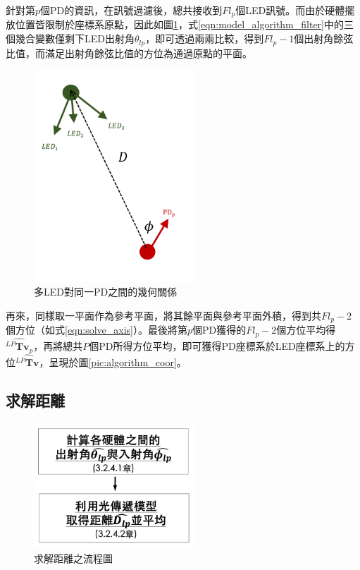     針對第$p$個PD的資訊，在訊號過濾後，總共接收到$Fl_p$個LED訊號。而由於硬體擺放位置皆限制於座標系原點，因此如圖\ref{pic:mulled_1pd}，式\ref{eqn:model_algorithm_filter}中的三個幾合變數僅剩下LED出射角$\theta_{lp}$，即可透過兩兩比較，得到$Fl_p-1$個出射角餘弦比值，而滿足出射角餘弦比值的方位為通過原點的平面。
    
    \begin{figure}[htpb]
        \centering
        \includegraphics[width=6cm]{ch3pic/mulled_1pd.png}
        \caption{多LED對同一PD之間的幾何關係}
        \label{pic:mulled_1pd}
    \end{figure}

    再來，同樣取一平面作為參考平面，將其餘平面與參考平面外積，得到共$Fl_p-2$個方位（如式\ref{eqn:solve_axis}）。最後將第$p$個PD獲得的$Fl_p-2$個方位平均得$\hat{{^{LP}\boldsymbol{Tv}_{p}}}$，再將總共$P$個PD所得方位平均，即可獲得PD座標系於LED座標系上的方位$\hat{{^{LP}\boldsymbol{Tv}}}$，呈現於圖\ref{pic:algorithm_coor}。
         
    


    \subsection{求解距離}
    \label{chp:solve_D}

    \begin{figure}[htpb]
        \centering
        \includegraphics[width=6cm]{ch3pic/solve_dis_flow.png}
        \caption{求解距離之流程圖}
        \label{pic:solve_dis_flow}
    \end{figure}

